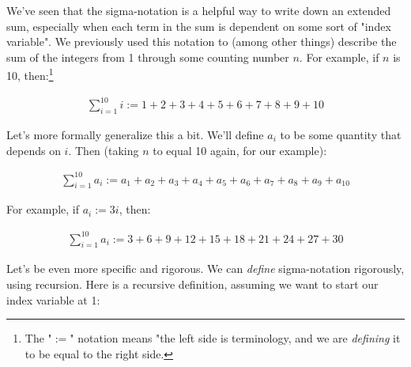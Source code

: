\begin{problem}
\label{defining-sigma}





We've seen that the sigma-notation is a helpful way to write down an extended sum, especially when each term in the sum is dependent on some sort of "index variable". We previously used this notation to (among other things) describe the sum of the integers from 1 through some counting number $n$. For example, if $n$ is 10, then:\footnote{The "$:=$" notation means "the left side is terminology, and we are \emph{defining} it to be equal to the right side.}

\begin{align*}
\sum_{i=1}^{10} i := 1 + 2 + 3 + 4 + 5 + 6 + 7 + 8 + 9 + 10 
\end{align*}

Let's more formally generalize this a bit. We'll define $a_i$ to be some quantity that depends on $i$. Then (taking $n$ to equal 10 again, for our example):

\begin{align*}
\sum_{i=1}^{10} a_i := a_1 + a_2 + a_3 + a_4 + a_5 + a_6 + a_7 + a_8 + a_9 + a_{10}
\end{align*}

For example, if $a_i := 3i$, then:

\begin{align*}
\sum_{i=1}^{10} a_i := 3 + 6 + 9 + 12 + 15 + 18 + 21 + 24 + 27 + 30
\end{align*}

Let's be even more specific and rigorous. We can \emph{define} sigma-notation rigorously, using recursion. Here is a recursive definition, assuming we want to start our index variable at 1:



\end{problem}
